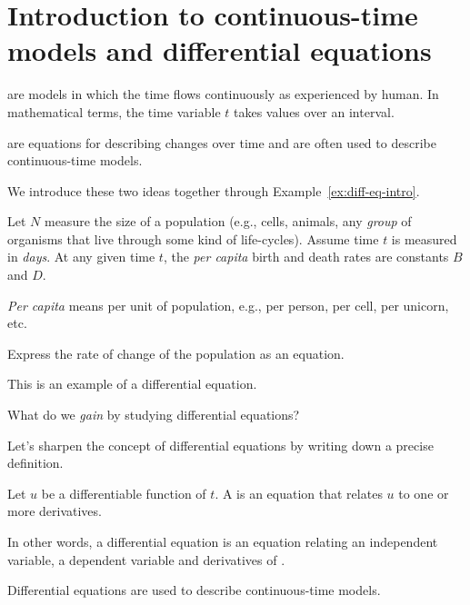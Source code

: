 \documentclass[../main.tex]{subfiles}
\begin{document}
 \section{Introduction to continuous-time models and differential equations}

 are models in which the time flows continuously as experienced by human. In mathematical terms, the time variable \(t\) takes values over an interval. 

 are equations for describing changes over time and are often used to describe continuous-time models.

We introduce these two ideas together through Example~\ref{ex:diff-eq-intro}.

\begin{example} \label{ex:diff-eq-intro}
  Let \(N\) measure the size of a population (e.g., cells, animals, any \emph{group} of organisms that live through some kind of life-cycles). Assume time \(t\) is measured in \emph{days}. At any given time \(t\), the \emph{per capita} birth and death rates are constants \(B\) and \(D\).  

  \emph{Per capita} means per unit of population, e.g., per person, per cell, per unicorn, etc.

  Express the rate of change of the population  as an equation.  

  This is an example of a differential equation.

  What do we \emph{gain} by studying differential equations?
\end{example}

\clearpage
Let's sharpen the concept of differential equations by writing down a precise definition.
\begin{definition}
  Let \(u\) be a differentiable function of \(t\). A  is an equation that relates \(u\) to one or more derivatives. 

  In other words, a differential equation is an equation relating an independent variable, a dependent variable and derivatives of \underline{\hspace{3in}}.

  \faExclamationTriangle{} Differential equations are used to describe continuous-time models.
\end{definition}
\end{document}
